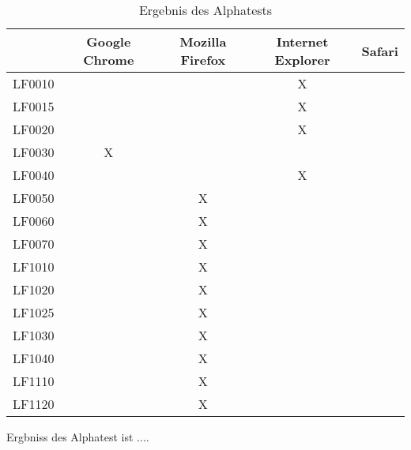 \begin{table}[htbp]
  \centering
    \begin{tabular}{l|cccc}
    \toprule
          & Google Chrome & Mozilla Firefox & Internet Explorer & Safari \\
    \midrule
    LF0010 &       &       & X     &  \\
    LF0015 &       &       & X     &  \\
    LF0020 &       &       & X     &  \\
    LF0030 & X     &       &       &  \\
    LF0040 &       &       & X     &  \\
    LF0050 &       & X     &       &  \\
    LF0060 &       & X     &       &  \\
    LF0070 &       & X     &       &  \\
    LF1010 &       & X     &       &  \\
    LF1020 &       & X     &       &  \\
    LF1025 &       & X     &       &  \\
    LF1030 &       & X     &       &  \\
    LF1040 &       & X     &       &  \\
    LF1110 &       & X     &       &  \\
    LF1120 &       & X     &       &  \\
    \bottomrule
    \end{tabular}
  \caption{Ergebnis des Alphatests}
  \label{tab:ErgebnisAlphatest}
\end{table}

Ergbniss des Alphatest ist ....